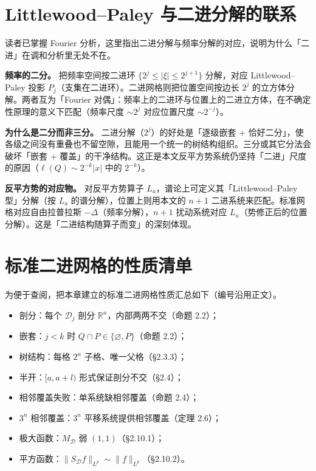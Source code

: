 \documentclass[a4paper,11pt,openany]{ctexbook}
\numberwithin{equation}{chapter}
\numberwithin{figure}{chapter}
\numberwithin{table}{chapter}
\begin{document}
\section{Littlewood–Paley 与二进分解的联系}

读者已掌握 Fourier 分析，这里指出二进分解与频率分解的对应，说明为什么「二进」在调和分析里无处不在。

\textbf{频率的二分。} 把频率空间按二进环 $\{2^j\le|\xi|\le 2^{j+1}\}$ 分解，对应 Littlewood–Paley 投影 $P_j$（支集在二进环）。二进网格则把位置空间按边长 $2^j$ 的立方体分解。两者互为「Fourier 对偶」：频率上的二进环与位置上的二进立方体，在不确定性原理的意义下匹配（频率尺度 $\sim 2^j$ 对应位置尺度 $\sim 2^{-j}$）。

\textbf{为什么是二分而非三分。} 二进分解（$2^j$）的好处是「逐级嵌套 + 恰好二分」，使各级之间没有重叠也不留空隙，且能用一个统一的树结构组织。三分或其它分法会破坏「嵌套 + 覆盖」的干净结构。这正是本文反平方势系统仍坚持「二进」尺度的原因（$\ell(Q)\sim2^{-k}|x|$ 中的 $2^{-k}$）。

\textbf{反平方势的对应物。} 对反平方势算子 $L_a$，谱论上可定义其「Littlewood–Paley 型」分解（按 $L_a$ 的谱分解），位置上则用本文的 $n+1$ 二进系统来匹配。标准网格对应自由拉普拉斯 $-\Delta$（频率分解），$n+1$ 扰动系统对应 $L_a$（势修正后的位置分解）。这是「二进结构随算子而变」的深刻体现。

\section{标准二进网格的性质清单}

为便于查阅，把本章建立的标准二进网格性质汇总如下（编号沿用正文）。

\begin{itemize}
\item 剖分：每个 $\mathcal D_j$ 剖分 $\mathbb R^n$，内部两两不交（命题 2.2）；
\item 嵌套：$j<k$ 时 $Q\cap P\in\{\varnothing,P\}$（命题 2.2）；
\item 树结构：每格 $2^n$ 子格、唯一父格（§2.3.3）；
\item 半开：$[a,a+l)$ 形式保证剖分不交（§2.4）；
\item 相邻覆盖失败：单系统缺相邻覆盖（命题 2.4）；
\item $3^n$ 相邻覆盖：$3^n$ 平移系统提供相邻覆盖（定理 2.6）；
\item 极大函数：$M_{\mathcal D}$ 弱 $(1,1)$（§2.10.1）；
\item 平方函数：$\|S_{\mathcal D}f\|_{L^p}\sim\|f\|_{L^p}$（§2.10.2）。
\end{itemize}
\end{document}
